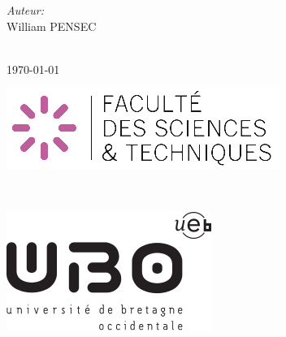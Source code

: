 \documentclass[a4paper,12pt]{report}
\begin{document}
\begin{titlepage}
		\begin{minipage}{0.48\textwidth}
			\begin{center} \large
				\emph{Auteur:}\\
					William \textsc{PENSEC} %
			\end{center}
    \end{minipage}\\[1.5cm]
    
    
    {\today}\\[1.5cm] %
    
    
		\begin{minipage}{0.48\textwidth}
			\begin{flushleft} \large
				\includegraphics[scale=0.8]{images/ubo_sc.png} %
			\end{flushleft}
    \end{minipage}
		~
    \begin{minipage}{0.48\textwidth}
			\begin{flushright} \large
				\includegraphics[scale=0.5]{images/ubo.png} %
			\end{flushright}
    \end{minipage}
    
    
    \vfill %
    
    \end{titlepage}
		
\end{document}
